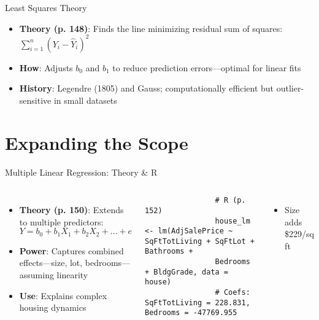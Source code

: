 \documentclass{beamer}
\begin{document}
	\begin{frame}{Least Squares Theory}
		\begin{itemize}
			\item \textbf{Theory (p. 148)}: Finds the line minimizing residual sum of squares: $\sum_{i=1}^n (Y_i - \hat{Y}_i)^2$
			\item \textbf{How}: Adjusts $b_0$ and $b_1$ to reduce prediction errors—optimal for linear fits
			\item \textbf{History}: Legendre (1805) and Gauss; computationally efficient but outlier-sensitive in small datasets
		\end{itemize}
	\end{frame}
	
	\section{Expanding the Scope}
	
	\begin{frame}[fragile]{Multiple Linear Regression: Theory \& R}
		\begin{columns}
			\begin{itemize}
				\item \textbf{Theory (p. 150)}: Extends to multiple predictors: $Y = b_0 + b_1X_1 + b_2X_2 + \dots + e$
				\item \textbf{Power}: Captures combined effects—size, lot, bedrooms—assuming linearity
				\item \textbf{Use}: Explains complex housing dynamics
			\end{itemize}
			\begin{lstlisting}
				# R (p. 152)
				house_lm <- lm(AdjSalePrice ~ SqFtTotLiving + SqFtLot + Bathrooms +
				Bedrooms + BldgGrade, data = house)
				# Coefs: SqFtTotLiving = 228.831, Bedrooms = -47769.955
			\end{lstlisting}
			\begin{itemize}
				\item Size adds \$229/sq ft
			\end{itemize}
		\end{columns}
	\end{frame}
	
\end{document}

